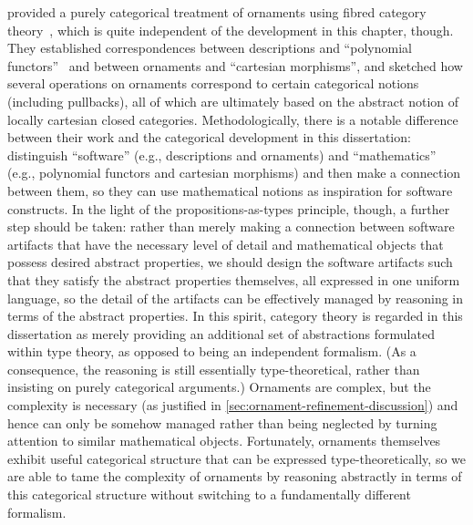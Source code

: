 \citet{Dagand-categorical-ornaments} provided a purely categorical treatment of ornaments using fibred category theory~\citep{Jacobs-categorical-logic-and-type-theory}, which is quite independent of the development in this chapter, though.
They established correspondences between descriptions and ``polynomial functors''~\citep{Gambino-polynomial-functors} and between ornaments and ``cartesian morphisms'', and sketched how several operations on ornaments correspond to certain categorical notions (including pullbacks), all of which are ultimately based on the abstract notion of locally cartesian closed categories.
Methodologically, there is a notable difference between their work and the categorical development in this dissertation: \citeauthor{Dagand-categorical-ornaments} distinguish ``software'' (e.g., descriptions and ornaments) and ``mathematics'' (e.g., polynomial functors and cartesian morphisms) and then make a connection between them, so they can use mathematical notions as inspiration for software constructs.
In the light of the propositions-as-types principle, though, a further step should be taken: rather than merely making a connection between software artifacts that have the necessary level of detail and mathematical objects that possess desired abstract properties, we should design the software artifacts such that they satisfy the abstract properties themselves, all expressed in one uniform language, so the detail of the artifacts can be effectively managed by reasoning in terms of the abstract properties.
In this spirit, category theory is regarded in this dissertation as merely providing an additional set of abstractions formulated within type theory, as opposed to being an independent formalism.
(As a consequence, the reasoning is still essentially type-theoretical, rather than insisting on purely categorical arguments.)
Ornaments are complex, but the complexity is necessary (as justified in \autoref{sec:ornament-refinement-discussion}) and hence can only be somehow managed rather than being neglected by turning attention to similar mathematical objects.
Fortunately, ornaments themselves exhibit useful categorical structure that can be expressed type-theoretically, so we are able to tame the complexity of ornaments by reasoning abstractly in terms of this categorical structure without switching to a fundamentally different formalism.

